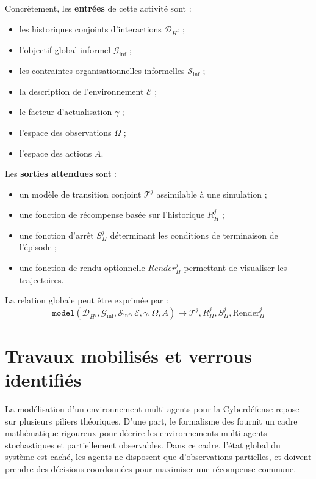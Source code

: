 Concrètement, les \textbf{entrées} de cette activité sont :
\begin{itemize}
  \item les historiques conjoints d'interactions $\mathcal{D}_{H^j}$ ;
  \item l'objectif global informel $\mathcal{G}_{\text{inf}}$ ;
  \item les contraintes organisationnelles informelles $\mathcal{S}_{\text{inf}}$ ;
  \item la description de l'environnement $\mathcal{E}$ ;
  \item le facteur d'actualisation $\gamma$ ;
  \item l'espace des observations $\Omega$ ;
  \item l'espace des actions $A$.
\end{itemize}

Les \textbf{sorties attendues} sont :
\begin{itemize}
  \item un modèle de transition conjoint $\mathcal{T}^j$ assimilable à une simulation ;
  \item une fonction de récompense basée sur l'historique $R^j_H$ ;
  \item une fonction d'arrêt $S^j_H$ déterminant les conditions de terminaison de l'épisode ;
  \item une fonction de rendu optionnelle $Render^j_H$ permettant de visualiser les trajectoires.
\end{itemize}

La relation globale peut être exprimée par :
\begin{displaymath}
  \texttt{model}(\mathcal{D}_{H^j}, \mathcal{G}_{\text{inf}}, \mathcal{S}_{\text{inf}}, \mathcal{E}, \gamma, \Omega, A) \rightarrow \mathcal{T}^j, R^j_H, S^j_H, \text{Render}^j_H
\end{displaymath}

\section{Travaux mobilisés et verrous identifiés}

La modélisation d'un environnement multi-agents pour la Cyberdéfense repose sur plusieurs piliers théoriques.
D'une part, le formalisme des \textbf{} fournit un cadre mathématique rigoureux pour décrire les environnements multi-agents stochastiques et partiellement observables.
Dans ce cadre, l'état global du système est caché, les agents ne disposent que d'observations partielles, et doivent prendre des décisions coordonnées pour maximiser une récompense commune.

